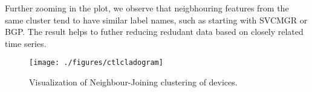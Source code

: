 Further zooming in the plot, we observe that neigbhouring features from the same cluster tend to have similar label names, such as starting with \textsf{SVCMGR} or \textsf{BGP}.
The result helps to futher reducing redudant data based on closely related time series. 

\begin{figure}
	\begin{center}
	\texttt{[image: ./figures/ctlcladogram]}
	\caption{Visualization of Neighbour-Joining clustering of devices.}
	\label{Fig:nj-vis}
	\end{center}
\end{figure}
